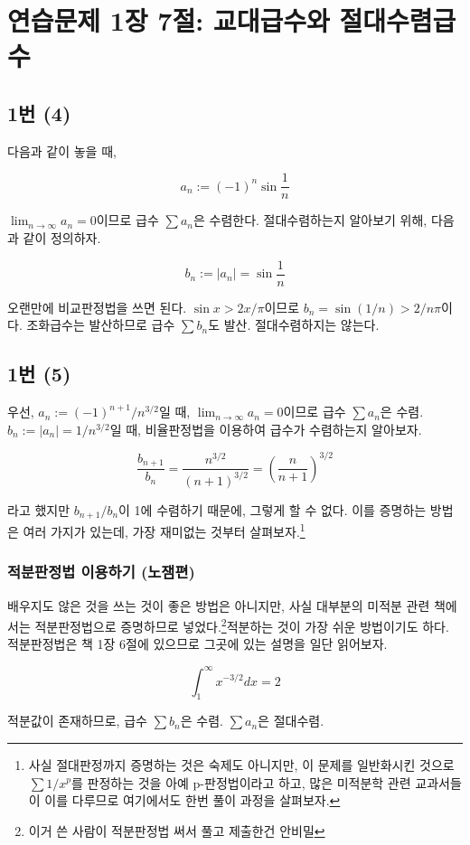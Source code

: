 \section{연습문제 1장 7절: 교대급수와 절대수렴급수}

\subsection{1번 (4)}
다음과 같이 놓을 때,

\[
a_n:=(-1)^n\sin \frac{1}{n}
\]

$\lim_{n\to\infty}a_n=0$이므로 급수 $\sum a_n$은 수렴한다. 절대수렴하는지 알아보기 위해, 다음과 같이 정의하자.

\[
b_n:=|a_n|=\sin \frac{1}{n}
\]

오랜만에 비교판정법을 쓰면 된다. $\sin x>2x/\pi$이므로 $b_n=\sin(1/n)>2/n\pi$이다. 조화급수는 발산하므로 급수 $\sum b_n$도 발산. 절대수렴하지는 않는다.

\subsection{1번 (5)}
우선, $a_n:=(-1)^{n+1}/n^{3/2}$일 때, $\lim_{n\to\infty}a_n=0$이므로 급수 $\sum a_n$은 수렴. $b_n:=|a_n|=1/n^{3/2}$일 때, 비율판정법을 이용하여 급수가 수렴하는지 알아보자.

\[
\frac{b_{n+1}}{b_n}=\frac{n^{3/2}}{(n+1)^{3/2}}=(\frac{n}{n+1})^{3/2}
\]

라고 했지만 $b_{n+1}/b_n$이 1에 수렴하기 때문에, 그렇게 할 수 없다. 이를 증명하는 방법은 여러 가지가 있는데, 가장 재미없는 것부터 살펴보자.\footnote{사실 절대판정까지 증명하는 것은 숙제도 아니지만, 이 문제를 일반화시킨 것으로 $\sum 1/x^p$를 판정하는 것을 아예 p-판정법이라고 하고, 많은 미적분학 관련 교과서들이 이를 다루므로 여기에서도 한번 풀이 과정을 살펴보자.}

\subsubsection{적분판정법 이용하기 (노잼편)}

배우지도 않은 것을 쓰는 것이 좋은 방법은 아니지만, 사실 대부분의 미적분 관련 책에서는 적분판정법으로 증명하므로 넣었다.\footnote{이거 쓴 사람이 적분판정법 써서 풀고 제출한건 안비밀}적분하는 것이 가장 쉬운 방법이기도 하다. 적분판정법은 책 1장 6절에 있으므로 그곳에 있는 설명을 일단 읽어보자.

\[
\int^\infty_1 x^{-3/2}dx=2
\]

적분값이 존재하므로, 급수 $\sum b_n$은 수렴. $\sum a_n$은 절대수렴.

